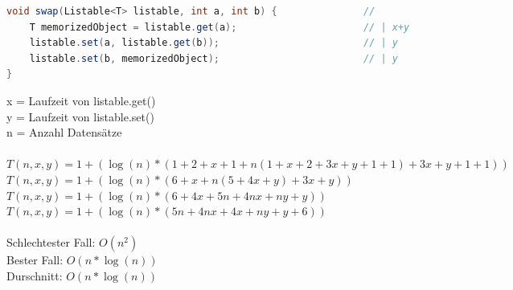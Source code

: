 \documentclass[a4paper, 11pt]{article}
\begin{document}
\begin{lstlisting}[language=java]
void swap(Listable<T> listable, int a, int b) {               //       |
    T memorizedObject = listable.get(a);                      // | x+y |
    listable.set(a, listable.get(b));                         // | y   | 3x+y
    listable.set(b, memorizedObject);                         // | y   |
}
\end{lstlisting}
x = Laufzeit von listable.get() \\
y = Laufzeit von listable.set() \\
n = Anzahl Datensätze \\
\ \\
\( T(n, x, y) = 1 + ( \log(n) * (1 + 2 + x + 1 + n(1 + x + 2 + 3x + y + 1 + 1) + 3x + y + 1 + 1)) \) \\
\( T(n, x, y) = 1 + ( \log(n) * (6 + x + n(5 + 4x + y) + 3x + y)) \) \\
\( T(n, x, y) = 1 + ( \log(n) * (6 + 4x + 5n + 4nx + ny + y)) \) \\
\( T(n, x, y) = 1 + ( \log(n) * (5n + 4nx + 4x + ny + y + 6)) \) \\
\ \\
Schlechtester Fall:      \( O(n^2) \) \\
Bester Fall:             \( O(n * \log(n)) \) \\
Durschnitt:              \( O(n * \log(n)) \) \\
\end{document}
